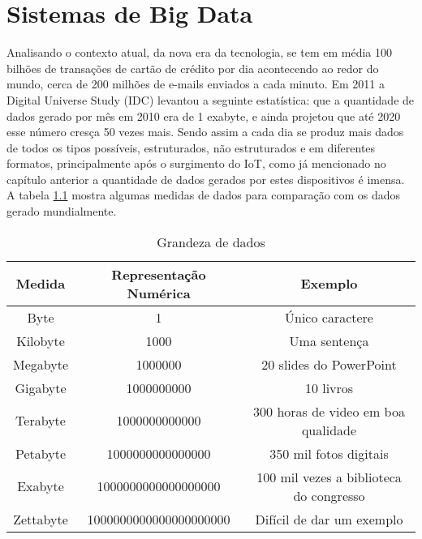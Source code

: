 \chapter{Sistemas de Big Data}
\label{chap:bigdata}
Analisando o contexto atual, da nova era da tecnologia, se tem em média 100 bilhões de transações de cartão de crédito por dia acontecendo ao redor do mundo, cerca de 200 milhões de e-mails enviados a cada minuto. Em 2011 a Digital Universe Study (IDC) levantou a seguinte estatística: que a quantidade de dados gerado por mês em 2010 era de 1 exabyte, e ainda projetou que até 2020 esse número cresça 50 vezes mais. Sendo assim a cada dia se produz mais dados de todos os tipos possíveis, estruturados, não estruturados e em diferentes formatos, principalmente após o surgimento do IoT, como já mencionado no capítulo anterior a quantidade de dados gerados por estes dispositivos é imensa. A tabela \ref{tab:medidadados} mostra algumas medidas de dados para comparação com os dados gerado mundialmente.~\cite{sinha2014making}

\begin{table}[h]
\centering
\caption{Grandeza de dados}
\label{tab:medidadados}
\begin{tabular}{|c|c|c|}
\hline 
\rule[-1ex]{0pt}{2.5ex} \textbf{Medida} & \textbf{Representação Numérica} & \textbf{Exemplo} \\ 
\hline 
\rule[-1ex]{0pt}{2.5ex} Byte & 1 & Único caractere \\ 
\hline 
\rule[-1ex]{0pt}{2.5ex} Kilobyte & 1000 & Uma sentença \\ 
\hline 
\rule[-1ex]{0pt}{2.5ex} Megabyte & 1000000 & 20 slides do PowerPoint \\ 
\hline 
\rule[-1ex]{0pt}{2.5ex} Gigabyte & 1000000000 & 10 livros \\ 
\hline 
\rule[-1ex]{0pt}{2.5ex} Terabyte & 1000000000000 & 300 horas de video em boa qualidade \\ 
\hline 
\rule[-1ex]{0pt}{2.5ex} Petabyte & 1000000000000000 & 350 mil fotos digitais \\ 
\hline 
\rule[-1ex]{0pt}{2.5ex} Exabyte & 1000000000000000000 & 100 mil vezes a biblioteca do congresso \\ 
\hline 
\rule[-1ex]{0pt}{2.5ex} Zettabyte & 1000000000000000000000 & Difícil de dar um exemplo \\ 
\hline 
\end{tabular} 
\end{table}


